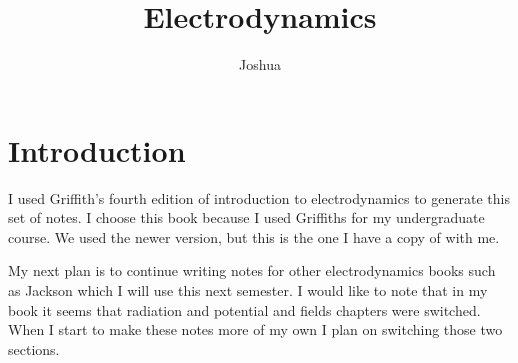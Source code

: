 \documentclass[preprint, review,12pt]{elsarticle}
\begin{document}
\begin{frontmatter}



\title{Electrodynamics}


\author{Joshua}



\end{frontmatter}



\tableofcontents

\section{Introduction}

I used Griffith's fourth edition of introduction to electrodynamics to generate this set of notes. \cite{GriffithsEM} I choose this book because I used Griffiths for my undergraduate course. We used the newer version, but this is the one I have a copy of with me. 

My next plan is to continue writing notes for other electrodynamics books such as Jackson which I will use this next semester. I would like to note that in my book it seems that radiation and potential and fields chapters were switched. When I start to make these notes more of my own I plan on switching those two sections.
\end{document}
